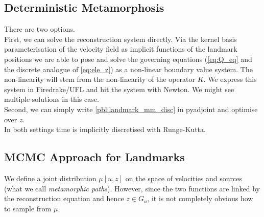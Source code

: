 \documentclass{article}
\begin{document}
\subsection{Deterministic Metamorphosis}

There are two options.\\

First, we can solve the reconstruction system directly. Via the kernel basis
parameterisation of the velocity field as implicit functions of the landmark
positions we are able to pose and solve the governing equations (\eqref{eq:Q_eq}
and the discrete analogue of \eqref{eq:ele_z}) as a non-linear boundary value
system. The non-linearity will stem from the non-linearity of the operator $K$.
We express this system in Firedrake/UFL and hit the system with Newton. We might
see multiple solutions in this case.\\

Second, we can simply write \eqref{pbl:landmark_mm_disc} in pyadjoint and optimise
over $z$.\\

In both settings time is implicitly discretised with Runge-Kutta.

\subsection{MCMC Approach for Landmarks}

We define a joint distribution $\mu[u,z]$ on the space of velocities and sources
(what we call \textit{metamorphic paths}). However, since the two functions are
linked by the reconstruction equation and hence $z \in G_u$, it is not
completely obvious how to sample from $\mu$.
\end{document}
